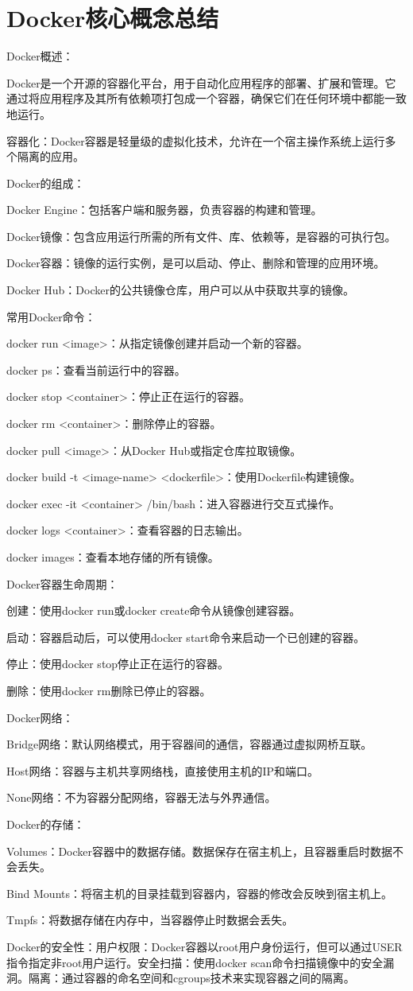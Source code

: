 \section{Docker核心概念总结}
{\footnotesize %
Docker概述：

Docker是一个开源的容器化平台，用于自动化应用程序的部署、扩展和管理。它通过将应用程序及其所有依赖项打包成一个容器，确保它们在任何环境中都能一致地运行。

容器化：Docker容器是轻量级的虚拟化技术，允许在一个宿主操作系统上运行多个隔离的应用。

Docker的组成：

Docker Engine：包括客户端和服务器，负责容器的构建和管理。

Docker镜像：包含应用运行所需的所有文件、库、依赖等，是容器的可执行包。

Docker容器：镜像的运行实例，是可以启动、停止、删除和管理的应用环境。

Docker Hub：Docker的公共镜像仓库，用户可以从中获取共享的镜像。

常用Docker命令：

docker run <image>：从指定镜像创建并启动一个新的容器。

docker ps：查看当前运行中的容器。

docker stop <container>：停止正在运行的容器。

docker rm <container>：删除停止的容器。

docker pull <image>：从Docker Hub或指定仓库拉取镜像。

docker build -t <image-name> <dockerfile>：使用Dockerfile构建镜像。

docker exec -it <container> /bin/bash：进入容器进行交互式操作。

docker logs <container>：查看容器的日志输出。

docker images：查看本地存储的所有镜像。

Docker容器生命周期：

创建：使用docker run或docker create命令从镜像创建容器。

启动：容器启动后，可以使用docker start命令来启动一个已创建的容器。

停止：使用docker stop停止正在运行的容器。

删除：使用docker rm删除已停止的容器。

Docker网络：

Bridge网络：默认网络模式，用于容器间的通信，容器通过虚拟网桥互联。

Host网络：容器与主机共享网络栈，直接使用主机的IP和端口。

None网络：不为容器分配网络，容器无法与外界通信。

Docker的存储：

Volumes：Docker容器中的数据存储。数据保存在宿主机上，且容器重启时数据不会丢失。

Bind Mounts：将宿主机的目录挂载到容器内，容器的修改会反映到宿主机上。

Tmpfs：将数据存储在内存中，当容器停止时数据会丢失。

Docker的安全性：用户权限：Docker容器以root用户身份运行，但可以通过USER指令指定非root用户运行。安全扫描：使用docker scan命令扫描镜像中的安全漏洞。隔离：通过容器的命名空间和cgroups技术来实现容器之间的隔离。
}
